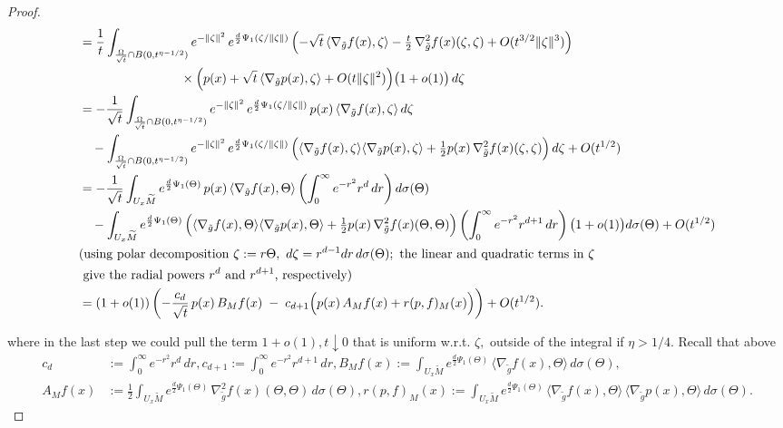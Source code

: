 \documentclass{amsart}
\theoremstyle{definition}
\theoremstyle{remark}
\newcommand{\nd}{\noindent}
\newcommand{\0}{\boldsymbol{0}}
\begin{document}
\begin{proof}
\begin{equation}
\begin{aligned}
&= \frac{1}{t}\int_{\frac{\Omega}{\sqrt{t}}\cap B(0,t^{\eta-1/2})}
   e^{-\|\zeta\|^2}\,
   e^{\frac{d}{2}\Psi_1(\zeta/\|\zeta\|)}\,
   \Bigl(-\sqrt{t}\,\langle\nabla_{\tilde{g}} f (x),\zeta\rangle
        -\tfrac{t}{2}\,\nabla^2_{\tilde{g}} f(x)(\zeta,\zeta)
        +O(t^{3/2}\|\zeta\|^3)\Bigr) \\
&\qquad\qquad\qquad\qquad \times
   \Bigl(p(x)+\sqrt{t}\,\langle\nabla_{\tilde{g}}  p(x),\zeta\rangle
        +O(t\|\zeta\|^2)\Bigr)\bigl(1+o(1)\bigr)\,d\zeta
\\
&= -\frac{1}{\sqrt{t}}\int_{\frac{\Omega}{\sqrt{t}}\cap B(0,t^{\eta-1/2})}
   e^{-\|\zeta\|^2}\,
   e^{\frac{d}{2}\Psi_1(\zeta/\|\zeta\|)}\,
   p(x)\,\langle\nabla_{\tilde{g}}  f(x),\zeta\rangle\,d\zeta
\\
&\quad
   -\int_{\frac{\Omega}{\sqrt{t}}\cap B(0,t^{\eta-1/2})}
   e^{-\|\zeta\|^2}\,
   e^{\frac{d}{2}\Psi_1(\zeta/\|\zeta\|)}\,
   \Bigl(\langle\nabla_{\tilde{g}} f(x),\zeta\rangle\langle\nabla_{\tilde{g}} p(x),\zeta\rangle
        +\tfrac{1}{2}p(x)\,\nabla_{\tilde{g}}^2 f(x)(\zeta,\zeta)\Bigr)\,d\zeta
   +O(t^{1/2})
\\
&= -\frac{1}{\sqrt{t}}\int_{U_x\widetilde M}
   e^{\frac{d}{2}\Psi_1(\Theta)}\,
   p(x)\,\langle\nabla_{\tilde{g}}  f(x),\Theta\rangle
   \left(\int_0^\infty e^{-r^2}r^{d}\,dr\right)
   d\sigma(\Theta)
\\
&\quad
   -\int_{U_x\widetilde M}
   e^{\frac{d}{2}\Psi_1(\Theta)}\,
   \Bigl(\langle\nabla_{\tilde{g}}  f(x),\Theta\rangle\langle\nabla_{\tilde{g}}  p(x),\Theta\rangle
        +\tfrac{1}{2}p(x)\,\nabla_{\tilde{g}} ^2 f(x)(\Theta,\Theta)\Bigr)
   \left(\int_0^\infty e^{-r^2}r^{d+1}\,dr\right)\bigl(1+o(1)\bigr)
   d\sigma(\Theta)
   +O(t^{1/2})
\\
&\text{(using polar decomposition } \zeta:=r\Theta,\ d\zeta=r^{d-1}dr\,d\sigma(\Theta);
\text{ the linear and quadratic terms in }\zeta \\
& \text{ give the radial powers }r^d
\text{ and }r^{d+1}\text{, respectively)}
\\
&= (1+o(1))\left(-\frac{c_d}{\sqrt{t}}\,p(x)\,B_M f(x)
   \;-\;c_{d+1}\Bigl(p(x)\,A_M f(x)
                    +r(p,f)_M(x)\Bigr)\right)
   +O(t^{1/2}) .
\end{aligned}
\end{equation}

\nd where in the last step we could pull the term $1+o(1), t\downarrow 0$ that is uniform w.r.t. $\zeta,$ outside of the integral if $\eta >1/4.$ Recall that above
\begin{align*}
c_d &:= \int_0^\infty e^{-r^2}r^{d}\,dr,
c_{d+1}:= \int_0^\infty e^{-r^2}r^{d+1}\,dr, B_M f(x)
:= \int_{U_x\widetilde M} e^{\frac{d}{2}\Psi_1(\Theta)}
    \,\langle\nabla_{\tilde{g}}  f(x),\Theta\rangle\,d\sigma(\Theta),\\
A_M f(x)
&:= \frac{1}{2}\int_{U_x\widetilde M} e^{\frac{d}{2}\Psi_1(\Theta)}
    \,\nabla^2_{\tilde{g}}  f(x)(\Theta,\Theta)\,d\sigma(\Theta),
r(p,f)_M(x):= \int_{U_x\widetilde M} e^{\frac{d}{2}\Psi_1(\Theta)}
    \,\langle\nabla_{\tilde{g}}  f(x),\Theta\rangle
     \,\langle\nabla_{\tilde{g}}  p(x),\Theta\rangle\,d\sigma(\Theta).
\end{align*}


\end{proof}
\end{document}
